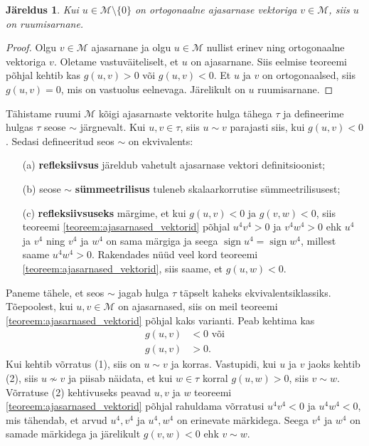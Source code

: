 \documentclass[12pt,a4paper,oneside]{article}
\theoremstyle{plain}
\newtheorem{jareldus}{Järeldus}[section]
\theoremstyle{definition}
\numberwithin{equation}{section}
\def\M{{\mathcal M}}
\DeclareMathOperator{\sign}{sign}
\begin{document}
\begin{jareldus}
Kui $u \in \M \setminus \{0\}$ on ortogonaalne ajasarnase vektoriga 
$v \in \M$, siis $u$ on ruumisarnane.
\end{jareldus}
\begin{proof}
Olgu $v \in \M$ ajasarnane ja olgu $u \in \M$ nullist erinev ning 
ortogonaalne vektoriga $v$. Oletame vastuväiteliselt, et $u$ on 
ajasarnane. Siis eelmise teoreemi põhjal kehtib kas 
$g\left(u,v\right) > 0$ või $g\left(u,v\right) < 0$. Et $u$ ja $v$ 
on ortogonaalsed, siis $g\left(u,v\right) = 0$, mis on vastuolus 
eelnevaga. Järelikult on $u$ ruumisarnane.
\end{proof}

Tähistame ruumi $\M$ kõigi ajasarnaste vektorite hulga tähega $\tau$ 
ja defineerime hulgas $\tau$ seose $\sim$ järgnevalt. Kui 
$u,v \in \tau$, siis $u \sim v$ parajasti siis, kui 
$g\left(u,v\right) < 0$. Sedasi defineeritud seos $\sim$ on 
ekvivalents:
\begin{itemize}
\item[(a)] \textbf{refleksiivsus} järeldub vahetult ajasarnase 
	vektori definitsioonist;
\item[(b)] seose $\sim$ \textbf{sümmeetrilisus} tuleneb 
	skalaarkorrutise sümmeetrilisusest;
\item[(c)] \textbf{refleksiivsuseks} märgime, et kui 
	$g\left(u,v\right) < 0$ ja $g\left(v, w\right) < 0$, siis 
	teoreemi \ref{teoreem:ajasarnased_vektorid} põhjal 
	$u^4 v^4 > 0$ ja $v^4 w^4 > 0$ ehk $u^4$ ja $v^4$ ning $v^4$ ja 
	$w^4$ on sama märgiga ja seega $\sign u^4 = \sign w^4$, millest 
	saame $u^4 w^4 > 0$. Rakendades nüüd veel kord teoreemi 
	\ref{teoreem:ajasarnased_vektorid}, siis saame, et 
	$g\left(u, w\right) < 0$.
\end{itemize}
Paneme tähele, et seos $\sim$ jagab hulga $\tau$ täpselt kaheks 
ekvivalentsiklassiks. Tõe\-poolest, kui $u, v \in \M$ on ajasarnased, 
siis on meil teoreemi \ref{teoreem:ajasarnased_vektorid} põhjal kaks 
varianti. Peab kehtima kas 
\begin{align}
g\left(u,v\right) &< 0 \text{ või} \tag{1} \\
g\left(u,v\right) &> 0. \tag{2}
\end{align}
Kui kehtib võrratus (1), siis on $u \sim v$ ja korras. Vastupidi, 
kui $u$ ja $v$ jaoks kehtib (2), siis $u \nsim v$ ja piisab näidata, 
et kui $w \in \tau$ korral $g\left(u,w\right) > 0$, siis $v \sim w$. 
Võrratuse (2) kehtivuseks peavad $u, v$ ja $w$ teoreemi 
\ref{teoreem:ajasarnased_vektorid} põhjal rahuldama võrratusi 
$u^4 v^4 < 0$ ja $u^4 w^4 < 0$, mis tähendab, et arvud $u^4, v^4$ ja 
$u^4, w^4$ on erinevate märkidega. Seega $v^4$ ja $w^4$ on samade 
märkidega ja järelikult $g\left(v,w\right) < 0$ ehk $v \sim w$.
\end{document}
